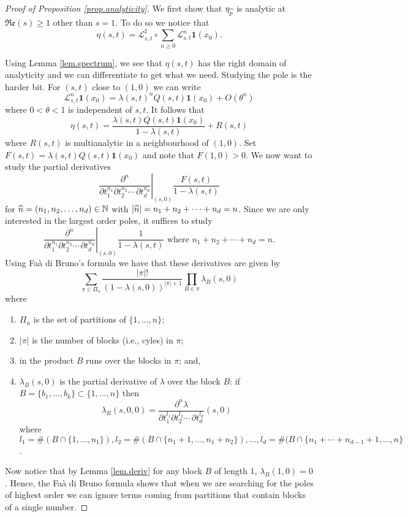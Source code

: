 \documentclass[12pt,a4paper,reqno]{amsart}
\begin{document}
\begin{proof}[Proof of Proposition \ref{prop.analyticity}]
We first show that $\eta_{\widehat{p}}$ is analytic at $\mathfrak{Re}(s) \ge 1$ other than $s=1$. To do so we notice that
\[
\eta(s,t) = \mathcal{L}_{s,t}^\sharp \circ \sum_{n\ge0} \mathcal{L}_{s,t}^n \textbf{1}(x_0).
\]

Using Lemma \ref{lem.spectrum}, we see that $\eta(s,t)$ has the right domain of analyticity and we can differentiate to get what we need. Studying the pole is the harder bit. For $(s,t)$ close to $(1,0)$ we can write 
\[
\mathcal{L}_{s,t}^n\textbf{1}(x_0) = \lambda(s,t)^n Q(s,t)\textbf{1}(x_0) + O(\theta^n)
\]
where $0 < \theta < 1$ is independent of $s,t$. It follows that
\[
\eta(s,t) = \frac{ \lambda(s,t)Q(s,t)\textbf{1}(x_0)}{1-\lambda(s,t)} + R(s,t)
\]
where $R(s,t)$ is multianalytic in a neighbourhood of $(1,0)$. Set $F(s,t) = \lambda(s,t)Q(s,t)\textbf{1}(x_0)$ and note that $F(1,0) > 0$.   We now  want to study the  partial derivatives
\[
\left. \frac{\partial^n}{\partial t_1^{n_1} \partial t_2^{n_2} \cdots \, \partial t_d^{n_d}} \right|_{(s,0)}  \frac{F(s,t)}{1-\lambda(s,t)}
\]
for $\widehat{n} = (n_1, n_2,\ldots,n_d) \in {\mathbb N}$ with $|\widehat{n}| = n_1 + n_2 + \cdots + n_d =n$.
Since we are only interested in the largest order poles, it suffices to study
\[
\left. \frac{\partial^n}{\partial t_1^{n_1} \partial t_2^{n_2} \cdots \, \partial t_d^{n_d}} \right|_{(s,0)}  \frac{1}{1-\lambda(s,t)}  \text{ where $n_1+n_2 + \cdots + n_d= n$.}
\]
Using Fa\`a di Bruno's formula we have that these derivatives are given by
\[
\sum_{\pi \in \Pi_n} \frac{|\pi|!}{(1-\lambda(s,0))^{|\pi|+1}} \prod_{B \in \pi} \lambda_B(s,0)
\]
where
\begin{enumerate}
\item $\Pi_n$ is the set of partitions of $\{1,\ldots,n\}$;
\item $|\pi|$ is the number of blocks  (i.e., cyles) in $\pi$;
\item in the product $B$ runs over the blocks in $\pi$; and,
\item $\lambda_B(s,0)$ is the partial derivative of $\lambda$ over the block $B$: if $B = \{ b_1,\ldots, b_k\}\subset \{ 1, \ldots, n\} $ then 
\[
\lambda_B(s,0,0) = \frac{\partial^n \lambda}{\partial t_1^{l_1} \partial t_2^{l_2} \cdots \, \partial t_d^{l_d}} (s,0)
\]
where $l_1 = \# (B \cap \{ 1,\ldots, n_1\}), l_2= \# (B \cap \{ n_1 + 1, \ldots, n_1+n_2\}), \ldots, l_d = \#(B \cap \{n_1 + \cdots + n_{d-1} +1, \ldots, n \}$.
\end{enumerate}
Now notice that by Lemma \ref{lem.deriv} for any block $B$ of length $1$, $\lambda_B(1,0) = 0$. Hence, the Fa\`a di Bruno formula shows that when we are searching for the poles of highest order we can ignore terms coming from partitions that contain blocks of a single number.


\end{proof}
\end{document}
